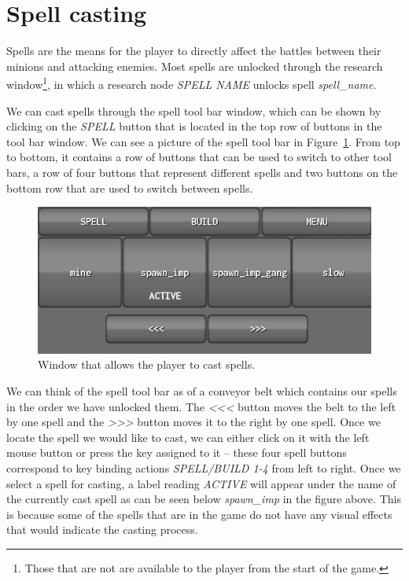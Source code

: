 \section{Spell casting}

Spells are the means for the player to directly affect the battles between their minions and attacking enemies. Most spells are unlocked
through the research window\footnote{Those that are not are available to the player from the start of the game.}, in which a research
node \emph{SPELL NAME} unlocks spell \emph{spell\_name}.

We can cast spells through the spell tool bar window, which can be shown by clicking on the \emph{SPELL} button that is located in the
top row of buttons in the tool bar window. We can see a picture of the spell tool bar in Figure~\ref{gui-spell}. From top to bottom, it
contains a row of buttons that can be used to switch to other tool bars, a row of four buttons that represent different spells and two
buttons on the bottom row that are used to switch between spells.

\begin{figure}[H]
    \centering
    \includegraphics[width=\textwidth]{../img/tool-spell.png}
    \caption{Window that allows the player to cast spells.}
    \label{gui-spell}
\end{figure}

We can think of the spell tool bar as of a conveyor belt which contains our spells in the order we have unlocked them. The
\emph{\textless\textless\textless} button moves the belt to the left by one spell and the \emph{\textgreater\textgreater\textgreater}
button moves it to the right by one spell. Once we locate the spell we would
like to cast, we can either click on it with the left mouse button or press the key assigned to it -- these four spell buttons correspond
to key binding actions \emph{SPELL/BUILD 1-4} from left to right. Once we select a spell for casting, a label reading \emph{ACTIVE} will
appear under the name of the currently cast spell as can be seen below \emph{spawn\_imp} in the figure above. This is because some of
the spells that are in the game do not have any visual effects that would indicate the casting process.

